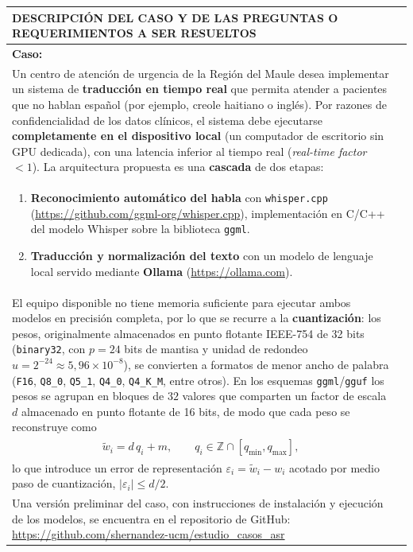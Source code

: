 \documentclass[12pt]{article}
\begin{document}
\newpage
\noindent
\begin{longtable}{|p{\textwidth}|@{}c@{}}
  \hline
  \centering\cellcolor{cyan}\textbf{\color{white}DESCRIPCIÓN DEL CASO Y DE LAS PREGUNTAS O REQUERIMIENTOS A SER RESUELTOS}&\\\hline
  \endhead
  \textbf{Caso:}&\\
  Un centro de atención de urgencia de la Región del Maule desea implementar un sistema de
  \textbf{traducción en tiempo real} que permita atender a pacientes que no hablan español (por ejemplo,
  creole haitiano o inglés). Por razones de confidencialidad de los datos clínicos, el sistema debe
  ejecutarse \textbf{completamente en el dispositivo local} (un computador de escritorio sin GPU dedicada),
  con una latencia inferior al tiempo real (\textit{real-time factor} $<1$). La arquitectura propuesta es
  una \textbf{cascada} de dos etapas:&\\
  \begin{enumerate}\setlength\itemsep{0pt}
  \item \textbf{Reconocimiento automático del habla} con \texttt{whisper.cpp}
  (\url{https://github.com/ggml-org/whisper.cpp}), implementación en C/C++ del modelo Whisper
  sobre la biblioteca \texttt{ggml}.
  \item \textbf{Traducción y normalización del texto} con un modelo de lenguaje local servido mediante
  \textbf{Ollama} (\url{https://ollama.com}).
  \end{enumerate}&\\


  El equipo disponible no tiene memoria suficiente para ejecutar ambos modelos en precisión completa,
  por lo que se recurre a la \textbf{cuantización}: los pesos, originalmente almacenados en punto flotante
  IEEE-754 de 32 bits (\texttt{binary32}, con $p=24$ bits de mantisa y unidad de redondeo
  $u=2^{-24}\approx 5{,}96\times10^{-8}$), se convierten a formatos de menor ancho de palabra
  (\texttt{F16}, \texttt{Q8\_0}, \texttt{Q5\_1}, \texttt{Q4\_0}, \texttt{Q4\_K\_M}, entre otros).
  En los esquemas \texttt{ggml}/\texttt{gguf} los pesos se agrupan en bloques de $32$ valores que comparten
  un factor de escala $d$ almacenado en punto flotante de 16 bits, de modo que cada peso se reconstruye como&\\
  \vspace{-4pt}
  \[
  \tilde{w}_i = d\,q_i + m, \qquad q_i \in \mathbb{Z}\cap[q_{\min},q_{\max}],
  \]
  \vspace{-14pt}&\\
  lo que introduce un error de representación $\varepsilon_i=\tilde{w}_i-w_i$ acotado por medio paso de
  cuantización, $|\varepsilon_i|\le d/2$. 
  
  &\\
   Una versión preliminar del caso, con instrucciones de instalación y ejecución de los modelos, se encuentra en el repositorio de GitHub:
  \url{https://github.com/shernandez-ucm/estudio_casos_asr}
  &\\\hline
\end{longtable}
\end{document}
